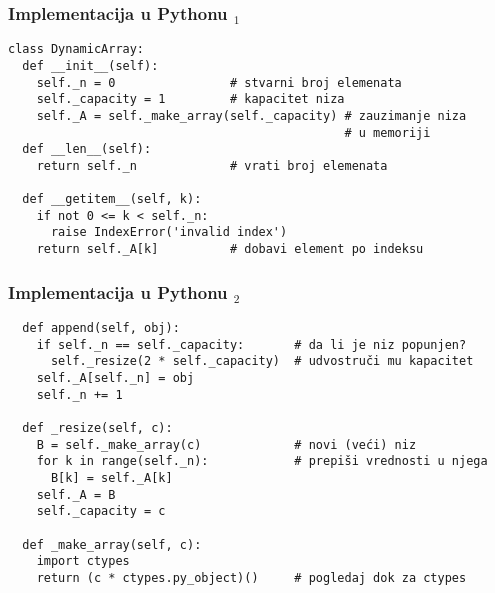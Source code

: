 \documentclass[compress]{beamer}
\begin{document}
\begin{frame}[fragile,shrink=15]
  \frametitle{Implementacija u Pythonu $_1$}
\begin{verbatim}
class DynamicArray:
  def __init__(self):
    self._n = 0                # stvarni broj elemenata
    self._capacity = 1         # kapacitet niza
    self._A = self._make_array(self._capacity) # zauzimanje niza
                                               # u memoriji
  def __len__(self):
    return self._n             # vrati broj elemenata
    
  def __getitem__(self, k):
    if not 0 <= k < self._n:
      raise IndexError('invalid index')
    return self._A[k]          # dobavi element po indeksu
\end{verbatim}
\end{frame}

\begin{frame}[fragile,shrink=15]
  \frametitle{Implementacija u Pythonu $_2$}
\begin{verbatim}
  def append(self, obj):
    if self._n == self._capacity:       # da li je niz popunjen?
      self._resize(2 * self._capacity)  # udvostruči mu kapacitet
    self._A[self._n] = obj
    self._n += 1
    
  def _resize(self, c):
    B = self._make_array(c)             # novi (veći) niz
    for k in range(self._n):            # prepiši vrednosti u njega
      B[k] = self._A[k]
    self._A = B
    self._capacity = c
    
  def _make_array(self, c):
    import ctypes
    return (c * ctypes.py_object)()     # pogledaj dok za ctypes
\end{verbatim}
\end{frame}
\end{document}
